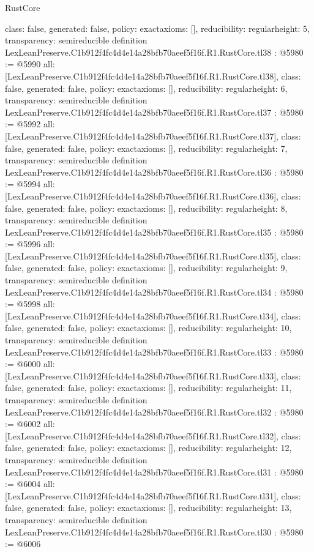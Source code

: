 \begin{lexlean}{RustCore}
\begin{coremodule}
{  class: false,
  generated: false,
  policy: exact{axioms: []},
  reducibility: regular{height: 5},
  transparency: semireducible
}
definition LexLeanPreserve.C1b912f4fc4d4e14a28bfb70aeef5f16f.R1.RustCore.tl38 : @5980 := @5990 {
  all: [LexLeanPreserve.C1b912f4fc4d4e14a28bfb70aeef5f16f.R1.RustCore.tl38],
  class: false,
  generated: false,
  policy: exact{axioms: []},
  reducibility: regular{height: 6},
  transparency: semireducible
}
definition LexLeanPreserve.C1b912f4fc4d4e14a28bfb70aeef5f16f.R1.RustCore.tl37 : @5980 := @5992 {
  all: [LexLeanPreserve.C1b912f4fc4d4e14a28bfb70aeef5f16f.R1.RustCore.tl37],
  class: false,
  generated: false,
  policy: exact{axioms: []},
  reducibility: regular{height: 7},
  transparency: semireducible
}
definition LexLeanPreserve.C1b912f4fc4d4e14a28bfb70aeef5f16f.R1.RustCore.tl36 : @5980 := @5994 {
  all: [LexLeanPreserve.C1b912f4fc4d4e14a28bfb70aeef5f16f.R1.RustCore.tl36],
  class: false,
  generated: false,
  policy: exact{axioms: []},
  reducibility: regular{height: 8},
  transparency: semireducible
}
definition LexLeanPreserve.C1b912f4fc4d4e14a28bfb70aeef5f16f.R1.RustCore.tl35 : @5980 := @5996 {
  all: [LexLeanPreserve.C1b912f4fc4d4e14a28bfb70aeef5f16f.R1.RustCore.tl35],
  class: false,
  generated: false,
  policy: exact{axioms: []},
  reducibility: regular{height: 9},
  transparency: semireducible
}
definition LexLeanPreserve.C1b912f4fc4d4e14a28bfb70aeef5f16f.R1.RustCore.tl34 : @5980 := @5998 {
  all: [LexLeanPreserve.C1b912f4fc4d4e14a28bfb70aeef5f16f.R1.RustCore.tl34],
  class: false,
  generated: false,
  policy: exact{axioms: []},
  reducibility: regular{height: 10},
  transparency: semireducible
}
definition LexLeanPreserve.C1b912f4fc4d4e14a28bfb70aeef5f16f.R1.RustCore.tl33 : @5980 := @6000 {
  all: [LexLeanPreserve.C1b912f4fc4d4e14a28bfb70aeef5f16f.R1.RustCore.tl33],
  class: false,
  generated: false,
  policy: exact{axioms: []},
  reducibility: regular{height: 11},
  transparency: semireducible
}
definition LexLeanPreserve.C1b912f4fc4d4e14a28bfb70aeef5f16f.R1.RustCore.tl32 : @5980 := @6002 {
  all: [LexLeanPreserve.C1b912f4fc4d4e14a28bfb70aeef5f16f.R1.RustCore.tl32],
  class: false,
  generated: false,
  policy: exact{axioms: []},
  reducibility: regular{height: 12},
  transparency: semireducible
}
definition LexLeanPreserve.C1b912f4fc4d4e14a28bfb70aeef5f16f.R1.RustCore.tl31 : @5980 := @6004 {
  all: [LexLeanPreserve.C1b912f4fc4d4e14a28bfb70aeef5f16f.R1.RustCore.tl31],
  class: false,
  generated: false,
  policy: exact{axioms: []},
  reducibility: regular{height: 13},
  transparency: semireducible
}
definition LexLeanPreserve.C1b912f4fc4d4e14a28bfb70aeef5f16f.R1.RustCore.tl30 : @5980 := @6006 {
}
\end{coremodule}
\end{lexlean}
